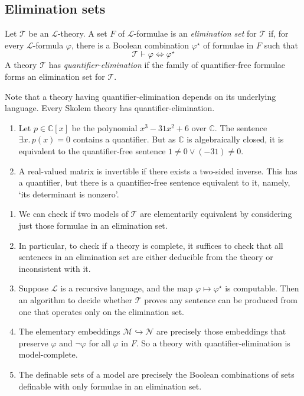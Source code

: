 \subsection{Elimination sets}
\begin{definition}
    Let \( \mathcal T \) be an \( \mathcal L \)-theory.
    A set \( F \) of \( \mathcal L \)-formulae is an \emph{elimination set} for \( \mathcal T \) if, for every \( \mathcal L \)-formula \( \varphi \), there is a Boolean combination \( \varphi^\star \) of formulae in \( F \) such that
    \[ \mathcal T \vdash \varphi \Leftrightarrow \varphi^\star \]
    A theory \( \mathcal T \) has \emph{quantifier-elimination} if the family of quantifier-free formulae forms an elimination set for \( \mathcal T \).
\end{definition}
Note that a theory having quantifier-elimination depends on its underlying language.
Every Skolem theory has quantifier-elimination.
\begin{example}
    \begin{enumerate}
        \item Let \( p \in \mathbb C[x] \) be the polynomial \( x^3 - 31x^2 + 6 \) over \( \mathbb C \).
        The sentence \( \exists x.\, p(x) = 0 \) contains a quantifier.
        But as \( \mathbb C \) is algebraically closed, it is equivalent to the quantifier-free sentence \( 1 \neq 0 \vee (-31) \neq 0 \).
        \item A real-valued matrix is invertible if there exists a two-sided inverse.
        This has a quantifier, but there is a quantifier-free sentence equivalent to it, namely, `its determinant is nonzero'.
    \end{enumerate}
\end{example}
\begin{remark}
    \begin{enumerate}
        \item We can check if two models of \( \mathcal T \) are elementarily equivalent by considering just those formulae in an elimination set.
        \item In particular, to check if a theory is complete, it suffices to check that all sentences in an elimination set are either deducible from the theory or inconsistent with it.
        \item Suppose \( \mathcal L \) is a recursive language, and the map \( \varphi \mapsto \varphi^\star \) is computable.
        Then an algorithm to decide whether \( \mathcal T \) proves any sentence can be produced from one that operates only on the elimination set.
        \item The elementary embeddings \( \mathcal M \hookrightarrow \mathcal N \) are precisely those embeddings that preserve \( \varphi \) and \( \neg \varphi \) for all \( \varphi \) in \( F \).
        So a theory with quantifier-elimination is model-complete. %
        \item The definable sets of a model are precisely the Boolean combinations of sets definable with only formulae in an elimination set.
    \end{enumerate}
\end{remark}
